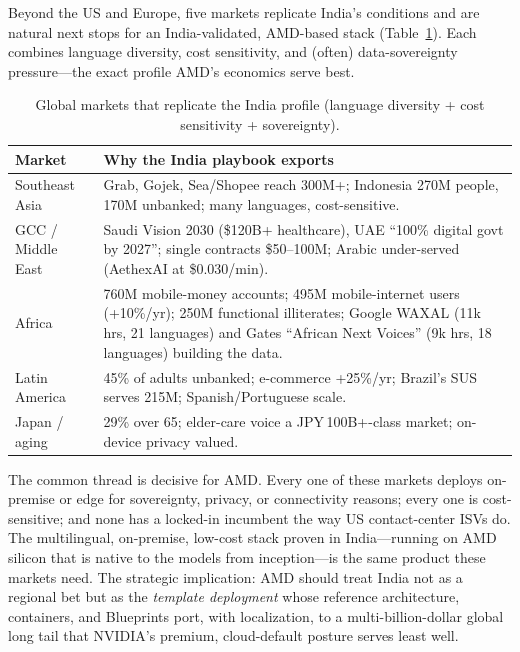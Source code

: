 \documentclass[blind]{gtac}
\begin{document}
Beyond the US and Europe, five markets replicate India's conditions and are natural next stops for an India-validated, AMD-based stack (Table~\ref{tab:global}). Each combines language diversity, cost sensitivity, and (often) data-sovereignty pressure---the exact profile AMD's economics serve best.

\begin{table}[H]
\centering
\caption{Global markets that replicate the India profile (language diversity + cost sensitivity + sovereignty).}
\label{tab:global}
\tiny
\begin{tabular}{@{}p{0.62in}p{1.95in}@{}}
\toprule
Market & Why the India playbook exports \\
\midrule
Southeast Asia & Grab, Gojek, Sea/Shopee reach 300M+; Indonesia 270M people, 170M unbanked; many languages, cost-sensitive. \\
GCC / Middle East & Saudi Vision 2030 (\$120B+ healthcare), UAE ``100\% digital govt by 2027''; single contracts \$50--100M; Arabic under-served (AethexAI at \$0.030/min). \\
Africa & 760M mobile-money accounts; 495M mobile-internet users (+10\%/yr); 250M functional illiterates; Google WAXAL (11k hrs, 21 languages) and Gates ``African Next Voices'' (9k hrs, 18 languages) building the data. \\
Latin America & 45\% of adults unbanked; e-commerce +25\%/yr; Brazil's SUS serves 215M; Spanish/Portuguese scale. \\
Japan / aging & 29\% over 65; elder-care voice a JPY\,100B+-class market; on-device privacy valued. \\
\bottomrule
\end{tabular}
\end{table}

The common thread is decisive for AMD. Every one of these markets deploys on-premise or edge for sovereignty, privacy, or connectivity reasons; every one is cost-sensitive; and none has a locked-in incumbent the way US contact-center ISVs do. The multilingual, on-premise, low-cost stack proven in India---running on AMD silicon that is native to the models from inception---is the same product these markets need. The strategic implication: AMD should treat India not as a regional bet but as the \emph{template deployment} whose reference architecture, containers, and Blueprints port, with localization, to a multi-billion-dollar global long tail that NVIDIA's premium, cloud-default posture serves least well.

\end{document}
